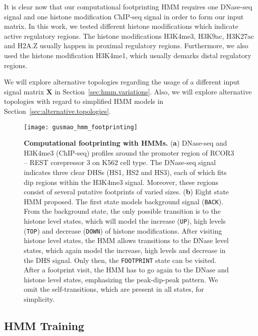 It is clear now that our computational footprinting HMM requires one DNase-seq signal and one histone modification ChIP-seq signal in order to form our input matrix. In this work, we tested different histone modifications which indicate active regulatory regions. The histone modifications H3K4me3, H3K9ac, H3K27ac and H2A.Z usually happen in proximal regulatory regions. Furthermore, we also used the histone modification H3K4me1, which usually demarks distal regulatory regions.

We will explore alternative topologies regarding the usage of a different input signal matrix $\mathbf{X}$ in Section~\ref{sec:hmm.variations}. Also, we will explore alternative topologies with regard to simplified HMM models in Section~\ref{sec:alternative.topologies}.

\begin{figure}[h!]
\centering
\texttt{[image: gusmao\_hmm\_footprinting]}
\caption[Computational footprinting with HMMs]{\textbf{Computational footprinting with HMMs.} (\textbf{a}) DNase-seq and H3K4me3 (ChIP-seq) profiles around the promoter region of RCOR3 -- REST corepressor 3 on K562 cell type. The DNase-seq signal indicates three clear DHSs (HS1, HS2 and HS3), each of which fits dip regions within the H3K4me3 signal. Moreover, these regions consist of several putative footprints of varied sizes. (\textbf{b}) Eight state HMM proposed. The first state models background signal ({\tt BACK}). From the background state, the only possible transition is to the histone level states, which will model the increase ({\tt UP}), high levels ({\tt TOP}) and decrease ({\tt DOWN}) of histone modifications. After visiting histone level states, the HMM allows transitions to the DNase level states, which again model the increase, high levels and decrease in the DHS signal. Only then, the {\tt FOOTPRINT} state can be visited. After a footprint visit, the HMM has to go again to the DNase and histone level states, emphasizing the peak-dip-peak pattern. We omit the self-transitions, which are present in all states, for simplicity.}
\label{fig:gusmao_hmm_footprinting}
\end{figure}

\subsection{HMM Training}
\label{sec:hmm.training}

